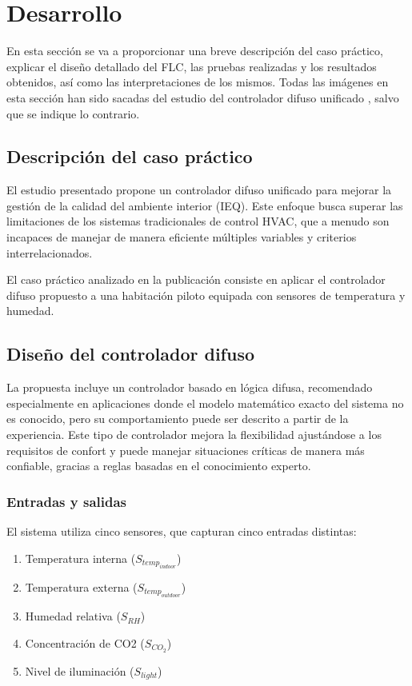 \section{Desarrollo}

En esta sección se va a proporcionar una breve descripción del caso práctico, explicar el diseño detallado del FLC, las pruebas realizadas y los resultados obtenidos, así como las interpretaciones de los mismos. Todas las imágenes en esta sección han sido sacadas del estudio del controlador difuso unificado \parencite{molina2013unifying}, salvo que se indique lo contrario.

\subsection{Descripción del caso práctico}

El estudio presentado propone un controlador difuso unificado para mejorar la gestión de la calidad del ambiente interior (IEQ). Este enfoque busca superar las limitaciones de los sistemas tradicionales de control HVAC, que a menudo son incapaces de manejar de manera eficiente múltiples variables y criterios interrelacionados. 

El caso práctico analizado en la publicación consiste en aplicar el controlador difuso propuesto a una habitación piloto equipada con sensores de temperatura y humedad. 

\subsection{Diseño del controlador difuso}

La propuesta incluye un controlador basado en lógica difusa, recomendado especialmente en aplicaciones donde el modelo matemático exacto del sistema no es conocido, pero su comportamiento puede ser descrito a partir de la experiencia. Este tipo de controlador mejora la flexibilidad ajustándose a los requisitos de confort y puede manejar situaciones críticas de manera más confiable, gracias a reglas basadas en el conocimiento experto.

\subsubsection{Entradas y salidas}

El sistema utiliza cinco sensores, que capturan cinco entradas distintas:

\begin{enumerate}
	\item Temperatura interna ($S_{temp_{indoor}}$)
	\item Temperatura externa ($S_{temp_{outdoor}}$)
	\item Humedad relativa ($S_{RH}$)
	\item Concentración de CO2 ($S_{CO_2}$)
	\item Nivel de iluminación ($S_{light}$)
\end{enumerate}

